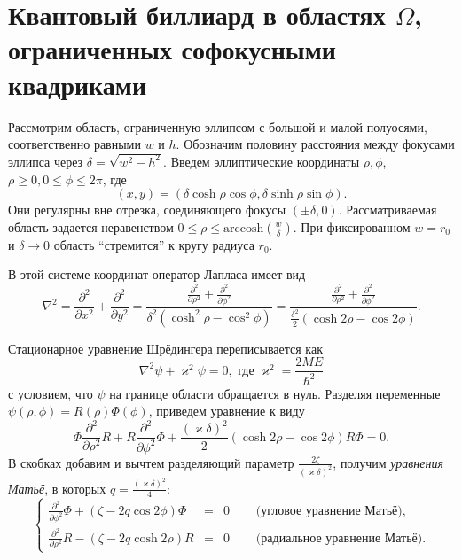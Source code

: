 \section{Квантовый биллиард в областях $\Omega$, ограниченных софокусными квадриками}\label{sec:ch1/sec4}
Рассмотрим область, ограниченную эллипсом с большой и малой полуосями, соответственно равными $w$ и $h$.
Обозначим половину расстояния между фокусами эллипса через  $\delta = \sqrt{w^2 - h^2}$.
Введем эллиптические координаты $\rho, \phi$, $\rho\ge 0, 0\le\phi \le 2\pi$, где 
$$(x, y) = (\delta\cosh{\rho}\cos{\phi}, \delta\sinh{\rho}\sin{\phi}). $$
Они регулярны вне отрезка, соединяющего фокусы $(\pm\delta,0)$.
 Рассматриваемая область задается неравенством $0 \leq \rho \leq \text{arccosh} (\frac{w}{\delta})$. 
При фиксированном $w=r_0$ и  $\delta\to 0$
область ``стремится'' к кругу радиуса $r_0$.
 
 В этой системе координат оператор Лапласа имеет вид
$$\nabla^2 = \frac{\partial^2}{\partial x^2} + \frac{\partial^2}{\partial y^2} = \frac{\frac{\partial^2}{\partial \rho^2} + \frac{\partial^2}{\partial \phi^2}}{\delta^2(\cosh^2{\rho} - \cos^2{\phi})} = 
\frac{\frac{\partial^2}{\partial \rho^2} + \frac{\partial^2}{\partial \phi^2}}{\frac{\delta^2}{2}(\cosh{2\rho} - \cos{2\phi})}.$$

 
Стационарное уравнение Шрёдингера 
переписывается как
$$ \nabla^2 \psi +\varkappa^2\psi =  0, \text{  где  }\varkappa^2 =\frac{2ME}{\hbar^2}$$
с условием, что $\psi$ на границе области обращается в нуль.
Разделяя переменные $\psi(\rho,\phi) = R(\rho)\Phi(\phi)$, приведем уравнение к виду
$$\Phi\frac{\partial^2}{\partial \rho^2}R + R\frac{\partial^2}{\partial \phi^2}\Phi + \frac{(\varkappa \delta)^2}{2}(\cosh{2\rho} - \cos{2\phi})R\Phi = 0. $$
В скобках добавим и вычтем разделяющий параметр $\frac{2\zeta}{(\varkappa \delta)^2}$, получим \textit{уравнения Матьё}, в которых $q=\frac{(\varkappa \delta)^2}{4}$:
\begin{equation}
\left\{
\begin{array}{rcll}

			\frac{\partial^2}{\partial \phi^2}\Phi + (\zeta - 2q\cos{2\phi})\Phi &= &0 \quad 	 &\textit{   (угловое уравнение Матьё)}, \\
		\frac{\partial^2}{\partial \rho^2}R - (\zeta - 2q\cosh{2\rho})R &=& 0 	\quad	& \textit{   (радиальное уравнение Матьё)}.  
\end{array}
\right.
\label{eq:mathieusystem}
\end{equation}



